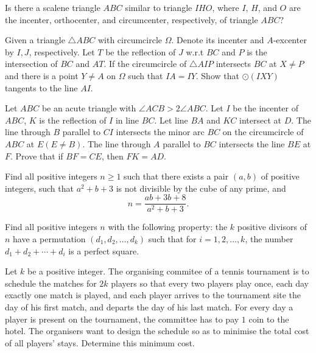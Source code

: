 \documentclass[11pt]{scrartcl}
\begin{document}
\begin{problem}[2672133756769464425]
Is there a scalene triangle $ABC$ similar to triangle $IHO$, where $I$, $H$, and $O$ are the incenter, orthocenter, and circumcenter, respectively, of triangle $ABC$?
\end{problem}
\begin{problem}[836909183133087]
Given a triangle $ \triangle{ABC} $ with circumcircle $ \Omega $. Denote its incenter and $ A $-excenter by $ I, J $, respectively. Let $ T $ be the reflection of $ J $ w.r.t $ BC $ and $ P $ is the intersection of $ BC $ and $ AT $. If the circumcircle of $ \triangle{AIP} $ intersects $ BC $ at $ X \neq P $ and there is a point $ Y \neq A $ on $ \Omega $ such that $ IA = IY $. Show that $ \odot\left(IXY\right) $ tangents to the line $ AI $.
\end{problem}
\begin{problem}[156060759856343521]
Let $ABC$ be an acute triangle with $\angle ACB>2 \angle ABC$. Let $I$ be the incenter of $ABC$, $K$ is the reflection of $I$ in line $BC$. Let line $BA$ and $KC$ intersect at $D$. The line through $B$ parallel to $CI$ intersects the minor arc $BC$ on the circumcircle of $ABC$ at $E(E \neq B)$. The line through $A$ parallel to $BC$ intersects the line $BE$ at $F$.
Prove that if $BF=CE$, then $FK=AD$.
\end{problem}
\begin{problem}[4375421764909014892]
	Find all positive integers $n\geq1$ such that there exists a pair $(a,b)$ of positive integers, such that $a^2+b+3$ is not divisible by the cube of any prime, and$$n=\frac{ab+3b+8}{a^2+b+3}.$$
\end{problem}
\begin{problem}[297274918587198]
	Find all positive integers $n$ with the following property: the $k$ positive divisors of $n$ have a permutation $(d_1,d_2,\ldots,d_k)$ such that for $i=1,2,\ldots,k$, the number $d_1+d_2+\cdots+d_i$ is a perfect square.
\end{problem}
\begin{problem}[8916142707013964275]
	Let $k$ be a positive integer. The organising commitee of a tennis tournament is to schedule the matches for $2k$ players so that every two players play once, each day exactly one match is played, and each player arrives to the tournament site the day of his first match, and departs the day of his last match. For every day a player is present on the tournament, the committee has to pay $1$ coin to the hotel. The organisers want to design the schedule so as to minimise the total cost of all players' stays. Determine this minimum cost.
\end{problem}
\end{document}
